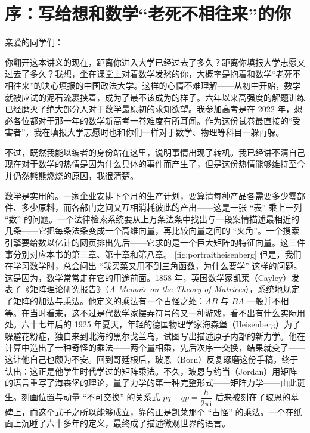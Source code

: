 \documentclass[lang=cn,10.5pt,scheme=chinese,toc=twocol,section,chinesefont=nofont,
twoside,citestyle=gb7714-2015,bibstyle=gb7714-2015]{elegantbook}
\newcommand*{\fangsong}{\CJKfamily{zhfs}}
\DeclareRobustCommand{\textbf}[1]{{\lnsemiboldlatin\lnsemiboldcjk #1}}
\numberwithin{equation}{section}   %
\begin{document}
\chapter*{序：写给想和数学“老死不相往来”的你}
{\fangsong
  亲爱的同学们：

  你翻开这本讲义的现在，距离你进入大学已经过去了多久？距离你填报大学志愿又过去了多久？我想，坐在课堂上对着数学发愁的你，大概率是抱着和数学“老死不相往来”的决心填报的中国政法大学。这样的心情不难理解——从初中开始，数学就被应试的泥石流裹挟着，成为了最不该成为的样子。六年以来高强度的解题训练已经磨灭了绝大部分人对于数学最原初的求知欲望。我参加高考是在 2022 年，想必各位都对于那一年的数学新高考一卷难度有所耳闻。作为这份试卷最直接的“受害者”，我在填报大学志愿时也和你们一样对于数学、物理等科目一躲再躲。

  不过，既然我能以编者的身份站在这里，说明事情出现了转机。我已经讲不清自己现在对于数学的热情是因为什么具体的事件而产生了，但是这份热情能够维持至今并仍然熊熊燃烧的原因，我很清楚。

  \textbf{数学是实用的。}一家企业安排下个月的生产计划，要算清每种产品各需要多少零部件、多少原料，而各部门之间又互相消耗彼此的产出——这是一张 “表” 乘上一列 “数” 的问题。一个法律检索系统要从上万条法条中找出与一段案情描述最相近的几条——它把每条法条变成一个高维向量，再比较向量之间的 “夹角”。一个搜索引擎要给数以亿计的网页排出先后——它求的是一个巨大矩阵的特征向量。这三件事分别对应本书的第三章、第十章和第八章。
  [fig:portraitheisenberg]
  但是，我们在学习数学时，总会问出 “我买菜又用不到三角函数，为什么要学” 这样的问题。这是因为，数学常常走在它的用途前面。1858 年，英国数学家凯莱（Cayley）发表了《矩阵理论研究报告》（\textit{A Memoir on the Theory of Matrices}），系统地规定了矩阵的加法与乘法。他定义的乘法有一个古怪之处：$AB$ 与 $BA$ 一般并不相等。在当时看来，这不过是代数学家摆弄符号的又一种游戏，看不出有什么实际用处。六十七年后的 1925 年夏天，年轻的德国物理学家海森堡（Heisenberg）为了躲避花粉症，独自来到北海的黑尔戈兰岛，试图写出描述原子内部的新力学。他在计算中造出了一种奇怪的乘法——两个量相乘，先后次序一交换，结果就变了——这让他自己也颇为不安。回到哥廷根后，玻恩（Born）反复琢磨这份手稿，终于认出：这正是他学生时代学过的矩阵乘法。不久，玻恩与约当（Jordan）用矩阵的语言重写了海森堡的理论，量子力学的第一种完整形式——矩阵力学——由此诞生。刻画位置与动量 “不可交换” 的关系式 $pq-qp=\dfrac{h}{2\pi \mathrm{i}}$ 后来被刻在了玻恩的墓碑上，而这个式子之所以能够成立，靠的正是凯莱那个 “古怪” 的乘法。一个在纸面上沉睡了六十多年的定义，最终成了描述微观世界的语言。

}
\end{document}
